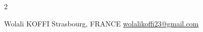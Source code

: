 \documentclass[lighthipster]{simplehipstercv}
\newlength{\rightcolwidth}
\begin{document}
\begin{paracol}{2}
\begin{minipage}[t]{0.3\textwidth}
\end{minipage}\hfill






\vfill{} %

\setlength{\parindent}{0pt}
\begin{minipage}[t]{\rightcolwidth}
\begin{center}\fontfamily{\sfdefault}\selectfont \color{black!70}
{\small Wolali KOFFI   Strasbourg, FRANCE   \newline{} \protect\url{wolalikoffi23@gmail.com}
}
\end{center}
\end{minipage}

\end{paracol}
\end{document}
